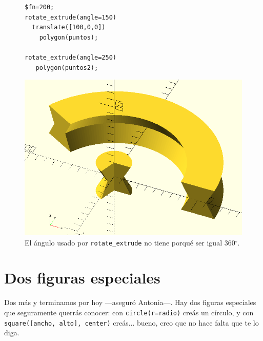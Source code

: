   \begin{figure}[ht]
  \begin{minipage}[]{.5\textwidth}%
\begin{lstlisting}
$fn=200;
rotate_extrude(angle=150)
  translate([100,0,0])
    polygon(puntos);
  
rotate_extrude(angle=250)
   polygon(puntos2);
    \end{lstlisting}%
  \end{minipage}\hfill
  \begin{minipage}[]{.5\textwidth}%
      \flushright
      \includegraphics[width=.9\textwidth]{imagenes/rotate-extrude-3}
    \end{minipage}
    \caption{El ángulo usado por \lstinline!rotate_extrude! no tiene
      porqué ser igual 360$^{\circ}$.}
    \label{fig:rotate-extrude-3}
  \end{figure}


  \section{Dos figuras especiales}

  \guillemotright Dos más y terminamos por hoy ---aseguró Antonia---.
  Hay dos figuras especiales que seguramente querrás conocer: con
  \lstinline!circle(r=radio)! creás un círculo, y con
  \lstinline!square([ancho, alto], center)!  creás... bueno, creo que
  no hace falta que te lo diga.

